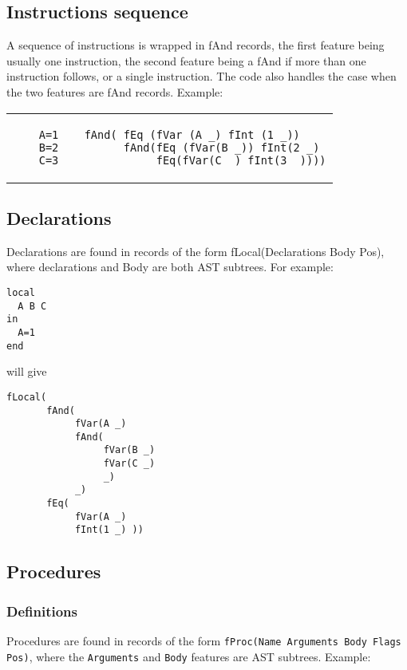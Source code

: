 \documentclass[a4paper]{memoir}
\begin{document}
\subsection{Instructions sequence}
A sequence of instructions is wrapped in fAnd records, the first feature being usually one instruction, the second feature being a fAnd if more than one instruction follows,  or a single instruction. The code also handles the case when the two features are fAnd records. %
Example:\\
\begin{tabular}{ p{} p{} }
  \begin{lstlisting}
    A=1
    B=2
    C=3
  \end{lstlisting}
&
  \footnotesize{
  \begin{verbatim}
  fAnd( fEq (fVar (A _) fInt (1 _))
        fAnd(fEq (fVar(B _)) fInt(2 _) 
             fEq(fVar(C _) fInt(3 _))))
  \end{verbatim}
  }
\end{tabular}

\subsection{Declarations}\label{sec:input:flocal}
Declarations are found in records of the form fLocal(Declarations Body Pos), where declarations and Body are both AST subtrees. 
For example:

\begin{lstlisting}
local
  A B C
in
  A=1
end
\end{lstlisting}
will give
\begin{verbatim}
fLocal(
       fAnd(
            fVar(A _) 
            fAnd(
                 fVar(B _) 
                 fVar(C _) 
                 _) 
            _) 
       fEq( 
            fVar(A _) 
            fInt(1 _) ))
\end{verbatim}

\subsection{Procedures}\label{sec:input:procedures}
\subsubsection{Definitions}
Procedures are found in records of the form \lstinline!fProc(Name Arguments Body Flags Pos)!, 
where the \lstinline!Arguments! and \lstinline!Body! features are AST subtrees. 
Example:
\end{document}
